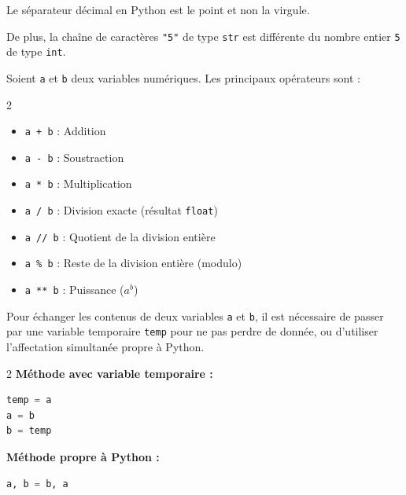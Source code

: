 \begin{attention}
	Le séparateur décimal en Python est le point et non la virgule.

	De plus, la chaîne de caractères \lstinline|"5"| de type \lstinline|str| est différente du nombre entier \lstinline|5| de type \lstinline|int|.
\end{attention}

\begin{prop}
	Soient \lstinline|a| et \lstinline|b| deux variables numériques. Les principaux opérateurs sont :
	\begin{multicols}{2}
		\begin{itemize}
			\item \lstinline|a + b| : Addition
			\item \lstinline|a - b| : Soustraction
			\item \lstinline|a * b| : Multiplication
			\item \lstinline|a / b| : Division exacte (résultat \lstinline|float|)
			\item \lstinline|a // b| : Quotient de la division entière
			\item \lstinline|a % b| : Reste de la division entière (modulo)
			\item \lstinline|a ** b| : Puissance ($a^b$)
		\end{itemize}
	\end{multicols}
\end{prop}

\newpage

\begin{methode}
	Pour échanger les contenus de deux variables \lstinline|a| et \lstinline|b|, il est nécessaire de passer par une variable temporaire \lstinline|temp| pour ne pas perdre de donnée, ou d'utiliser l'affectation simultanée propre à Python.

	\begin{correction}
		\nline
		{
			\setlength{\columnseprule}{0.6pt}
			\begin{multicols}{2}
				\noindent\textbf{Méthode avec variable temporaire :}
				\begin{lstlisting}[language=Python]
temp = a
a = b
b = temp
\end{lstlisting}
				\columnbreak
				\noindent\textbf{Méthode propre à Python :}
				\begin{lstlisting}[language=Python]
a, b = b, a
	
	
\end{lstlisting}
			\end{multicols}
		}
	\end{correction}
\end{methode}

